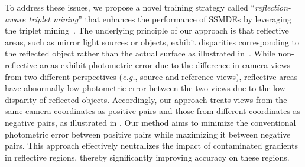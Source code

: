 To address these issues, we propose a novel training strategy called ``\textit{reflection-aware triplet mining}'' that enhances the performance of SSMDEs by leveraging the triplet mining~\citep{schroff2015facenet}. 
The underlying principle of our approach is that reflective areas, such as mirror light sources or objects, exhibit disparities corresponding to the reflected object rather than the actual surface as illustrated in~.
While non-reflective areas exhibit photometric error due to the difference in camera views from two different perspectives (\textit{e.g.}, source and reference views), reflective areas have abnormally low photometric error between the two views due to the low disparity of reflected objects.
Accordingly, our approach treats views from the same camera coordinates as positive pairs and those from different coordinates as negative pairs, as illustrated in . 
Our method aims to minimize the conventional photometric error between positive pairs while maximizing it between negative pairs. This approach effectively neutralizes the impact of contaminated gradients in reflective regions, thereby significantly improving accuracy on these regions.


